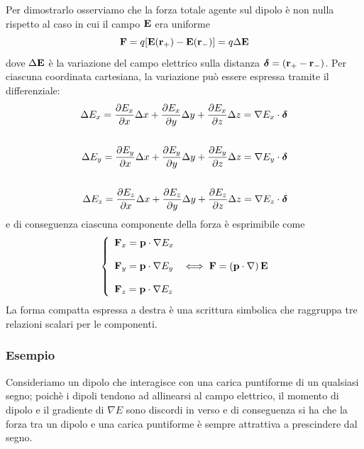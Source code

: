 Per dimostrarlo osserviamo che la forza  totale agente sul dipolo \`e non nulla rispetto al caso in cui il campo $\bold{E}$ era uniforme 
\begin{equation*}
	\bold{F} = q [\bold{E}(\bold{r}_+) - \bold{E}(\bold{r}_{-})] = q \Delta \bold{E}
\end{equation*}
dove $\Delta \bold{E}$ \`e la variazione del campo elettrico sulla distanza $\bm{\delta} = (\bold{r}_+ - \bold{r}_-)$. Per ciascuna coordinata cartesiana, la variazione pu\`o essere espressa tramite il differenziale:
\begin{align*}
	\Delta E_{x} = \frac{\partial E_x}{\partial x} \Delta x + \frac{\partial E_x}{\partial y} \Delta y + \frac{\partial E_x}{\partial z}\Delta z = \nabla E_x \cdot \bm{\delta} \\ \rule{0pt}{30pt} 
	\Delta E_{y} = \frac{\partial E_y}{\partial x} \Delta x + \frac{\partial E_y}{\partial y} \Delta y + \frac{\partial E_y}{\partial z}\Delta z = \nabla E_y \cdot \bm{\delta} \\ \rule{0pt}{30pt}
		\Delta E_{z} = \frac{\partial E_z}{\partial x} \Delta x + \frac{\partial E_z}{\partial y} \Delta y + \frac{\partial E_z}{\partial z}\Delta z = \nabla E_z \cdot \bm{\delta} \\ 
\end{align*}
e di conseguenza ciascuna componente della forza \`e esprimibile come 
\begin{align}
\left \{ \begin{array}{l}
\bold{F}_{x} = \bold{p} \cdot \nabla E_x \\ \rule{0pt}{20pt}
\bold{F}_{y} = \bold{p} \cdot \nabla E_y \\ \rule{0pt}{20pt}
\bold{F}_{z} = \bold{p} \cdot \nabla E_z
\end{array}\right.
\iff \bold{F} = (\bold{p} \cdot \nabla )\,\bold{E} 	
\end{align}
La forma compatta espressa a destra \`e una scrittura simbolica che raggruppa tre relazioni scalari per le componenti.

\subsubsection{Esempio}

Consideriamo un dipolo che interagisce con una carica puntiforme di un qualsiasi segno; poich\`e i dipoli tendono ad allinearsi al campo elettrico, il momento di dipolo e il gradiente di $\nabla E$ sono discordi in verso e di conseguenza si ha che la forza tra un dipolo e una carica puntiforme \`e sempre attrattiva a prescindere dal segno.

